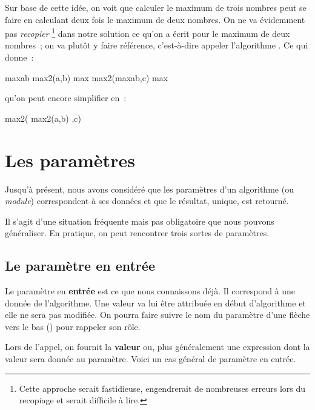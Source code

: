 	Sur base de cette idée, 
	on voit que calculer le maximum de trois nombres
	peut se faire en calculant deux fois le maximum de deux nombres.
	On ne va évidemment pas \emph{recopier}%
	\footnote{
		Cette approche serait fastidieuse,
		engendrerait de nombreuses erreurs lors du recopiage
		et serait difficile à lire.
	} dans notre solution
	ce qu’on a écrit pour le maximum de deux nombres~;
	on va plutôt y faire référence, 
	c’est-à-dire appeler l’algorithme . 
	Ce qui donne~:

	\begin{LDA}
		\Let maxab \Gets max2(a,b)
		\Let max \Gets max2(maxab,c)
		\Return max
	\EndAlgo
	\end{LDA}

	qu’on peut encore simplifier en~:
	
	\begin{LDA}
	\Algo{max3}{\Par{a,b,c}{réels}}{réel}
		\Return max2( max2(a,b) ,c)
	\EndAlgo
	\end{LDA}

\section{Les paramètres}

	Jusqu’à présent,
	nous avons considéré que les paramètres d’un algorithme (ou \emph{module})
	correspondent à ses données et que le résultat, unique,
	est retourné.

	Il s’agit d’une situation fréquente mais pas obligatoire
	que nous pouvons généraliser.
	En pratique, on peut rencontrer trois sortes de paramètres.

	\subsection{Le paramètre en entrée}

		Le paramètre en \textbf{entrée}
		est ce que nous connaissons déjà.
		Il correspond à une donnée de l’algorithme.
		Une valeur va lui être attribuée en début d’algorithme
		et elle ne sera pas modifiée.
		On pourra faire suivre le nom du paramètre d’une flèche
		vers le bas (\In) pour rappeler son rôle.
		
		Lors de l’appel, on fournit la \textbf{valeur}
		ou, plus généralement une expression
		dont la valeur sera donnée au paramètre.
		Voici un cas général de paramètre en entrée.
		
